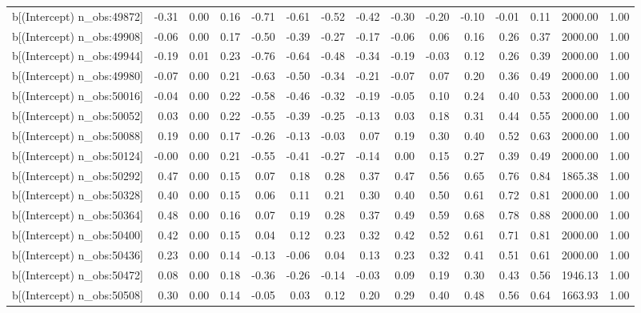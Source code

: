 \begin{table}[ht]
\begin{tabular}{rrrrrrrrrrrrrrr}
  b[(Intercept) n\_obs:49872] & -0.31 & 0.00 & 0.16 & -0.71 & -0.61 & -0.52 & -0.42 & -0.30 & -0.20 & -0.10 & -0.01 & 0.11 & 2000.00 & 1.00 \\ 
  b[(Intercept) n\_obs:49908] & -0.06 & 0.00 & 0.17 & -0.50 & -0.39 & -0.27 & -0.17 & -0.06 & 0.06 & 0.16 & 0.26 & 0.37 & 2000.00 & 1.00 \\ 
  b[(Intercept) n\_obs:49944] & -0.19 & 0.01 & 0.23 & -0.76 & -0.64 & -0.48 & -0.34 & -0.19 & -0.03 & 0.12 & 0.26 & 0.39 & 2000.00 & 1.00 \\ 
  b[(Intercept) n\_obs:49980] & -0.07 & 0.00 & 0.21 & -0.63 & -0.50 & -0.34 & -0.21 & -0.07 & 0.07 & 0.20 & 0.36 & 0.49 & 2000.00 & 1.00 \\ 
  b[(Intercept) n\_obs:50016] & -0.04 & 0.00 & 0.22 & -0.58 & -0.46 & -0.32 & -0.19 & -0.05 & 0.10 & 0.24 & 0.40 & 0.53 & 2000.00 & 1.00 \\ 
  b[(Intercept) n\_obs:50052] & 0.03 & 0.00 & 0.22 & -0.55 & -0.39 & -0.25 & -0.13 & 0.03 & 0.18 & 0.31 & 0.44 & 0.55 & 2000.00 & 1.00 \\ 
  b[(Intercept) n\_obs:50088] & 0.19 & 0.00 & 0.17 & -0.26 & -0.13 & -0.03 & 0.07 & 0.19 & 0.30 & 0.40 & 0.52 & 0.63 & 2000.00 & 1.00 \\ 
  b[(Intercept) n\_obs:50124] & -0.00 & 0.00 & 0.21 & -0.55 & -0.41 & -0.27 & -0.14 & 0.00 & 0.15 & 0.27 & 0.39 & 0.49 & 2000.00 & 1.00 \\ 
  b[(Intercept) n\_obs:50292] & 0.47 & 0.00 & 0.15 & 0.07 & 0.18 & 0.28 & 0.37 & 0.47 & 0.56 & 0.65 & 0.76 & 0.84 & 1865.38 & 1.00 \\ 
  b[(Intercept) n\_obs:50328] & 0.40 & 0.00 & 0.15 & 0.06 & 0.11 & 0.21 & 0.30 & 0.40 & 0.50 & 0.61 & 0.72 & 0.81 & 2000.00 & 1.00 \\ 
  b[(Intercept) n\_obs:50364] & 0.48 & 0.00 & 0.16 & 0.07 & 0.19 & 0.28 & 0.37 & 0.49 & 0.59 & 0.68 & 0.78 & 0.88 & 2000.00 & 1.00 \\ 
  b[(Intercept) n\_obs:50400] & 0.42 & 0.00 & 0.15 & 0.04 & 0.12 & 0.23 & 0.32 & 0.42 & 0.52 & 0.61 & 0.71 & 0.81 & 2000.00 & 1.00 \\ 
  b[(Intercept) n\_obs:50436] & 0.23 & 0.00 & 0.14 & -0.13 & -0.06 & 0.04 & 0.13 & 0.23 & 0.32 & 0.41 & 0.51 & 0.61 & 2000.00 & 1.00 \\ 
  b[(Intercept) n\_obs:50472] & 0.08 & 0.00 & 0.18 & -0.36 & -0.26 & -0.14 & -0.03 & 0.09 & 0.19 & 0.30 & 0.43 & 0.56 & 1946.13 & 1.00 \\ 
  b[(Intercept) n\_obs:50508] & 0.30 & 0.00 & 0.14 & -0.05 & 0.03 & 0.12 & 0.20 & 0.29 & 0.40 & 0.48 & 0.56 & 0.64 & 1663.93 & 1.00 \\ 

\end{tabular}
\end{table}
